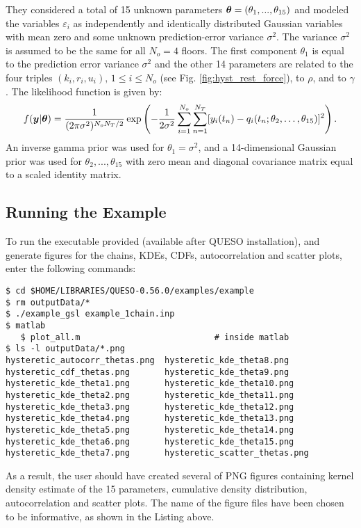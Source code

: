 They considered a total of 15 unknown parameters $\mbox{\boldmath$ \theta $} = (\theta_1 , . . . , \theta_{15})$ and modeled the variables $\varepsilon_i$ as independently and identically distributed Gaussian variables with mean zero and some unknown prediction-error variance $\sigma^2$. The variance $\sigma^2$ is assumed to be the same for all $N_o = 4$ floors.  The first component $\theta_1$ is equal to the prediction error variance $\sigma^2$ and the other 14 parameters are related to the four triples $(k_i, r_i, u_i),\, 1 \leq i \leq N_o$ (see Fig. \ref{fig:hyst_rest_force}), to $\rho$, and to $\gamma$. The likelihood function is given by:
\begin{equation}\label{eq:hyst:like}
 f(\mbox{\boldmath$ y $}|\mbox{\boldmath$ \theta $}) = \dfrac{1}{(2 \pi \sigma^2)^{N_oN_T/2}}\exp \left( -\dfrac{1}{2\sigma^2} \displaystyle \sum_{i=1}^{N_o} \sum_{n=1}^{N_T} [y_i(t_n) - {q}_i(t_n; \theta_2,\ldots,\theta_{15})]^2 \right).
\end{equation}
An inverse gamma  prior was used for $\theta_1=\sigma^2$, and a 14-dimensional Gaussian prior was used for $\theta_2 , ..., \theta_{15}$ with zero mean and diagonal covariance matrix equal to a scaled identity matrix.


\subsection{Running the Example}\label{sec:hysteretic-run}

To run the executable provided (available after QUESO installation), and generate figures for the chains, KDEs, CDFs, autocorrelation and scatter plots, enter the following commands:
\begin{lstlisting}[label={},caption={}]
$ cd $HOME/LIBRARIES/QUESO-0.56.0/examples/example
$ rm outputData/*
$ ./example_gsl example_1chain.inp    
$ matlab
   $ plot_all.m	                          # inside matlab   
$ ls -l outputData/*.png
hysteretic_autocorr_thetas.png  hysteretic_kde_theta8.png 
hysteretic_cdf_thetas.png       hysteretic_kde_theta9.png
hysteretic_kde_theta1.png       hysteretic_kde_theta10.png
hysteretic_kde_theta2.png       hysteretic_kde_theta11.png
hysteretic_kde_theta3.png       hysteretic_kde_theta12.png
hysteretic_kde_theta4.png       hysteretic_kde_theta13.png
hysteretic_kde_theta5.png       hysteretic_kde_theta14.png
hysteretic_kde_theta6.png       hysteretic_kde_theta15.png
hysteretic_kde_theta7.png       hysteretic_scatter_thetas.png
\end{lstlisting}


As a result, the user should have created several of PNG figures containing kernel density estimate of the 15 parameters, cumulative density distribution, autocorrelation and scatter plots. The name of the figure files have been chosen to be informative, as shown in the Listing above.

